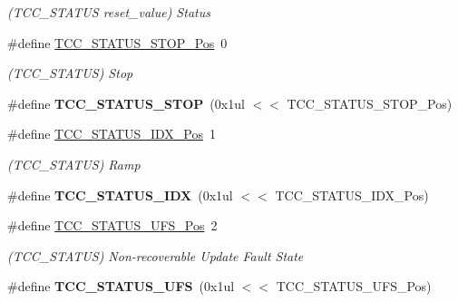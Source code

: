 \begin{DoxyCompactItemize}
\begin{DoxyCompactList}\small\item\em (T\+C\+C\+\_\+\+S\+T\+A\+T\+U\+S reset\+\_\+value) Status \end{DoxyCompactList}\item 
\hypertarget{group___s_a_m_l21___t_c_c_ga13b21ca0f2e4fe5709986e23e1341867}{}\#define \hyperlink{group___s_a_m_l21___t_c_c_ga13b21ca0f2e4fe5709986e23e1341867}{T\+C\+C\+\_\+\+S\+T\+A\+T\+U\+S\+\_\+\+S\+T\+O\+P\+\_\+\+Pos}~0\label{group___s_a_m_l21___t_c_c_ga13b21ca0f2e4fe5709986e23e1341867}

\begin{DoxyCompactList}\small\item\em (T\+C\+C\+\_\+\+S\+T\+A\+T\+U\+S) Stop \end{DoxyCompactList}\item 
\hypertarget{group___s_a_m_l21___t_c_c_ga93186d87966134edbd781697e4953af8}{}\#define {\bfseries T\+C\+C\+\_\+\+S\+T\+A\+T\+U\+S\+\_\+\+S\+T\+O\+P}~(0x1ul $<$$<$ T\+C\+C\+\_\+\+S\+T\+A\+T\+U\+S\+\_\+\+S\+T\+O\+P\+\_\+\+Pos)\label{group___s_a_m_l21___t_c_c_ga93186d87966134edbd781697e4953af8}

\item 
\hypertarget{group___s_a_m_l21___t_c_c_gad4ab60f34efbe107db7de65fed45b119}{}\#define \hyperlink{group___s_a_m_l21___t_c_c_gad4ab60f34efbe107db7de65fed45b119}{T\+C\+C\+\_\+\+S\+T\+A\+T\+U\+S\+\_\+\+I\+D\+X\+\_\+\+Pos}~1\label{group___s_a_m_l21___t_c_c_gad4ab60f34efbe107db7de65fed45b119}

\begin{DoxyCompactList}\small\item\em (T\+C\+C\+\_\+\+S\+T\+A\+T\+U\+S) Ramp \end{DoxyCompactList}\item 
\hypertarget{group___s_a_m_l21___t_c_c_ga20aa80e7bc2323e81468f78febf3c80b}{}\#define {\bfseries T\+C\+C\+\_\+\+S\+T\+A\+T\+U\+S\+\_\+\+I\+D\+X}~(0x1ul $<$$<$ T\+C\+C\+\_\+\+S\+T\+A\+T\+U\+S\+\_\+\+I\+D\+X\+\_\+\+Pos)\label{group___s_a_m_l21___t_c_c_ga20aa80e7bc2323e81468f78febf3c80b}

\item 
\hypertarget{group___s_a_m_l21___t_c_c_ga2ba90030d876d09e4782bfc0c538512d}{}\#define \hyperlink{group___s_a_m_l21___t_c_c_ga2ba90030d876d09e4782bfc0c538512d}{T\+C\+C\+\_\+\+S\+T\+A\+T\+U\+S\+\_\+\+U\+F\+S\+\_\+\+Pos}~2\label{group___s_a_m_l21___t_c_c_ga2ba90030d876d09e4782bfc0c538512d}

\begin{DoxyCompactList}\small\item\em (T\+C\+C\+\_\+\+S\+T\+A\+T\+U\+S) Non-\/recoverable Update Fault State \end{DoxyCompactList}\item 
\hypertarget{group___s_a_m_l21___t_c_c_ga78825c5ea77131bf1799f220afef633e}{}\#define {\bfseries T\+C\+C\+\_\+\+S\+T\+A\+T\+U\+S\+\_\+\+U\+F\+S}~(0x1ul $<$$<$ T\+C\+C\+\_\+\+S\+T\+A\+T\+U\+S\+\_\+\+U\+F\+S\+\_\+\+Pos)\label{group___s_a_m_l21___t_c_c_ga78825c5ea77131bf1799f220afef633e}


\end{DoxyCompactItemize}
